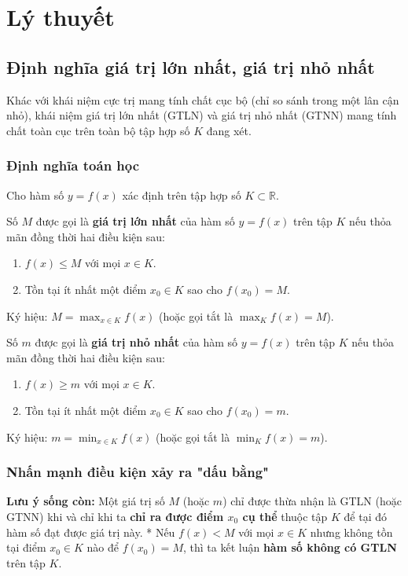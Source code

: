 \documentclass[12pt]{article}
\begin{document}
	\section{Lý thuyết}
	
	\subsection{Định nghĩa giá trị lớn nhất, giá trị nhỏ nhất}
	
	Khác với khái niệm cực trị mang tính chất cục bộ (chỉ so sánh trong một lân cận nhỏ), khái niệm giá trị lớn nhất (GTLN) và giá trị nhỏ nhất (GTNN) mang tính chất toàn cục trên toàn bộ tập hợp số $K$ đang xét.
	
	\subsubsection{Định nghĩa toán học}
	Cho hàm số $y = f(x)$ xác định trên tập hợp số $K \subset \mathbb{R}$.
	
	\begin{tcolorbox}[colback=blue!5!white, colframe=blue!60!black, title=Giá trị lớn nhất (GTLN)]
		Số $M$ được gọi là \textbf{giá trị lớn nhất} của hàm số $y = f(x)$ trên tập $K$ nếu thỏa mãn đồng thời hai điều kiện sau:
		\begin{enumerate}[label=\arabic*.]
			\item $f(x) \le M$ với mọi $x \in K$.
			\item Tồn tại ít nhất một điểm $x_0 \in K$ sao cho $f(x_0) = M$.
		\end{enumerate}
		Ký hiệu: $M = \max_{x \in K} f(x)$ \quad (hoặc gọi tắt là $\max_{K} f(x) = M$).
	\end{tcolorbox}
	
	\begin{tcolorbox}[colback=red!5!white, colframe=red!60!black, title=Giá trị nhỏ nhất (GTNN)]
		Số $m$ được gọi là \textbf{giá trị nhỏ nhất} của hàm số $y = f(x)$ trên tập $K$ nếu thỏa mãn đồng thời hai điều kiện sau:
		\begin{enumerate}[label=\arabic*.]
			\item $f(x) \ge m$ với mọi $x \in K$.
			\item Tồn tại ít nhất một điểm $x_0 \in K$ sao cho $f(x_0) = m$.
		\end{enumerate}
		Ký hiệu: $m = \min_{x \in K} f(x)$ \quad (hoặc gọi tắt là $\min_{K} f(x) = m$).
	\end{tcolorbox}
	
	\subsubsection{Nhấn mạnh điều kiện xảy ra "dấu bằng"}
	\textbf{Lưu ý sống còn:} Một giá trị số $M$ (hoặc $m$) chỉ được thừa nhận là GTLN (hoặc GTNN) khi và chỉ khi ta \textbf{chỉ ra được điểm $x_0$ cụ thể} thuộc tập $K$ để tại đó hàm số đạt được giá trị này.
	*   Nếu $f(x) < M$ với mọi $x \in K$ nhưng không tồn tại điểm $x_0 \in K$ nào để $f(x_0) = M$, thì ta kết luận \textbf{hàm số không có GTLN} trên tập $K$.
	
\end{document}
